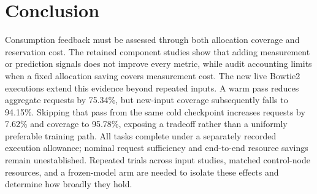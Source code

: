 \section{Conclusion}
\label{sec:conclusion}
Consumption feedback must be assessed through both allocation coverage
and reservation cost. The retained component studies show that adding
measurement or prediction signals does not improve every metric, while
audit accounting limits when a fixed allocation saving covers measurement
cost. The new live Bowtie2 executions extend this evidence beyond repeated
inputs. A warm pass reduces aggregate requests by 75.34\%, but new-input
coverage subsequently falls to 94.15\%. Skipping that pass from the same
cold checkpoint increases requests by 7.62\% and coverage to 95.78\%,
exposing a tradeoff rather than a uniformly preferable training path.
All tasks complete under a separately recorded execution allowance;
nominal request sufficiency and end-to-end resource savings remain
unestablished. Repeated trials across input studies, matched control-node
resources, and a frozen-model arm are needed to isolate these effects
and determine how broadly they hold.
